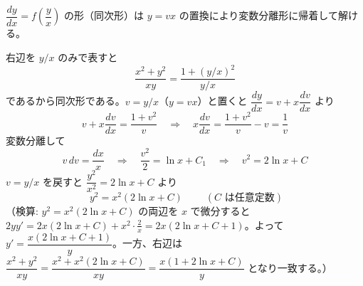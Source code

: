 
$\dfrac{dy}{dx} = f\!\left(\dfrac{y}{x}\right)$ の形（同次形）は $y = vx$ の置換により変数分離形に帰着して解ける。

右辺を $y/x$ のみで表すと
\[
\frac{x^{2}+y^{2}}{xy} = \frac{1 + (y/x)^{2}}{y/x}
\]
であるから同次形である。$v = y/x$（$y = vx$）と置くと $\dfrac{dy}{dx} = v + x\dfrac{dv}{dx}$ より
\[
v + x\frac{dv}{dx} = \frac{1+v^{2}}{v}
\quad\Longrightarrow\quad
x\frac{dv}{dx} = \frac{1+v^{2}}{v} - v = \frac{1}{v}
\]
変数分離して
\[
v\,dv = \frac{dx}{x}
\quad\Longrightarrow\quad
\frac{v^{2}}{2} = \ln x + C_{1}
\quad\Longrightarrow\quad
v^{2} = 2\ln x + C
\]
$v = y/x$ を戻すと $\dfrac{y^{2}}{x^{2}} = 2\ln x + C$ より
\[
\boxed{\; y^{2} = x^{2}\left(2\ln x + C\right) \;}
\qquad (C \text{ は任意定数})
\]
（検算: $y^{2}=x^{2}(2\ln x+C)$ の両辺を $x$ で微分すると $2yy' = 2x(2\ln x+C) + x^{2}\cdot\frac{2}{x} = 2x(2\ln x+C+1)$。よって $y' = \dfrac{x(2\ln x+C+1)}{y}$。一方、右辺は $\dfrac{x^{2}+y^{2}}{xy} = \dfrac{x^{2}+x^{2}(2\ln x+C)}{xy} = \dfrac{x(1+2\ln x+C)}{y}$ となり一致する。）
